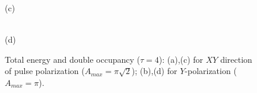 \begin{figure}[h!]
\begin{minipage}[h]{0.5\linewidth}
\end{minipage}
\begin{minipage}[h]{0.5\linewidth}
 (c) \\
\end{minipage}
\hfill
\begin{minipage}[h]{0.5\linewidth}
 \\(d)
\end{minipage}
\caption{Total energy and double occupancy ($\tau = 4$): (a),(c) for $XY$ direction of pulse polarization ($A_{max} =\pi\sqrt{2}$); (b),(d) for $Y$-polarization ($A_{max} = \pi$).}
\label{fig:E_tot}
\end{figure}

